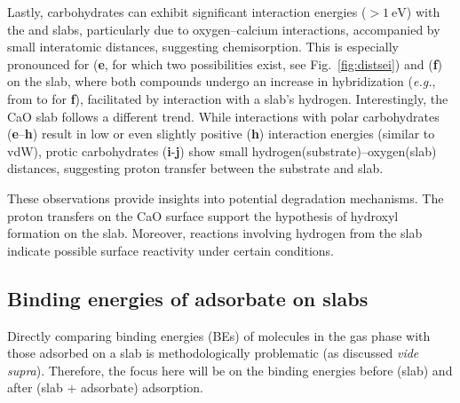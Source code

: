 \documentclass[journal=jpccck,manuscript=article]{achemso}
\begin{document}
Lastly, carbohydrates can exhibit significant interaction energies ($> \SI{1}{\electronvolt}$) with the  and  slabs, particularly due to oxygen--calcium interactions, accompanied by small interatomic distances, suggesting chemisorption. This is especially pronounced for  (\textbf{e}, for which two possibilities exist, see Fig.~\ref{fig:distsei}) and  (\textbf{f}) on the  slab, where both compounds undergo an increase in hybridization (\textit{e.g.}, from  to  for \textbf{f}), facilitated by interaction with a slab's hydrogen.
Interestingly, the CaO slab follows a different trend. While interactions with polar carbohydrates (\textbf{e}–\textbf{h}) result in low or even slightly positive (\textbf{h}) interaction energies (similar to vdW), protic carbohydrates (\textbf{i}-\textbf{j}) show small hydrogen(substrate)--oxygen(slab) distances, suggesting proton transfer between the substrate and slab.

These observations provide insights into potential degradation mechanisms. The proton transfers on the CaO surface support the hypothesis of hydroxyl formation on the slab. Moreover, reactions involving hydrogen from the  slab indicate possible surface reactivity under certain conditions.

\clearpage
\subsection{Binding energies of adsorbate on slabs}

\newcommand{\XPSsa}[2]{
	\begin{figure}[!h]
		\centering
		\texttt{[image: Figure\#1]}
		\caption{Difference (dotted line) between the XPS spectra before (dashed line) and after (solid line) adsorption for compounds \textbf{#2} on various substrates, as computed using the \cp{E_\infty} protocol. Letters indicate mean binding energies for bulk (``b"), surface (``s", with $\star$ marking the atom closest to the adsorbate), surface hydroxides (``h"), and different atoms of the adsorbate.}
		\label{fig:spectraXPSads#2}
	\end{figure}
}

Directly comparing binding energies (BEs) of molecules in the gas phase with those adsorbed on a slab is methodologically problematic (as discussed \textit{vide supra}). Therefore, the focus here will be on the binding energies before (slab) and after (slab + adsorbate) adsorption.
\end{document}
